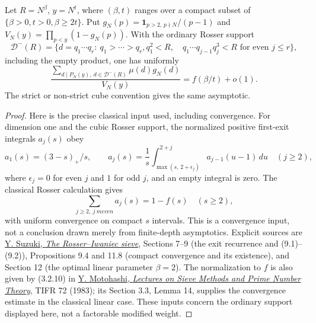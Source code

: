 \begin{lemma}
\label{lem:uniform-residual-lower-density}
Let $R=N^\beta$, $y=N^t$, where $(\beta,t)$ ranges over a compact
subset of $\{\beta>0,t>0,\beta\ge2t\}$. Put
$g_N(p)=\mathbf1_{p>2,\,p\nmid N}/(p-1)$ and
$V_N(y)=\prod_{p<y}(1-g_N(p))$. With the ordinary Rosser support
\[
 \mathcal D^-(R)=\{d=q_1\cdots q_r:\ q_1>\cdots>q_r,
 q_1^2<R,\quad q_1\cdots q_{j-1}q_j^3<R
 \text{ for even }j\le r\},
\]
including the empty product, one has uniformly
\[
 \frac{\sum_{d\mid P_N(y),\ d\in\mathcal D^-(R)}\mu(d)g_N(d)}
 {V_N(y)}=f(\beta/t)+o(1).
\]
The strict or non-strict cube convention gives the same asymptotic.
\end{lemma}
\begin{proof}
Here is the precise classical input used, including convergence. For
dimension one and the cubic Rosser support, the normalized positive
first-exit integrals $a_j(s)$ obey
\[
 a_1(s)=(3-s)_+/s,\qquad
 a_j(s)=\frac1s\int_{\max(s,\,2+\epsilon_j)}^{2+j}
                  a_{j-1}(u-1)\,du\quad(j\ge2),
\]
where $\epsilon_j=0$ for even $j$ and $1$ for odd $j$, and an
empty integral is zero. The classical Rosser calculation gives
\begin{equation}\label{eq:classical-positive-exit-series}
 \sum_{j\ge2,\ j\ {
m even}}a_j(s)=1-f(s)\quad(s\ge2),
\end{equation}
with uniform convergence on compact $s$ intervals. This is a
convergence input, not a conclusion drawn merely from finite-depth
asymptotics. Explicit sources are
\href{https://www.suzuyu1729.com/notes/NagoyaSeminar2022/RosserIwaniec.pdf}
{Y. Suzuki, \emph{The Rosser--Iwaniec sieve}}, Sections 7--9
(the exit recurrence and (9.1)--(9.2)), Propositions 9.4 and 11.8
(compact convergence and its existence), and Section 12
(the optimal linear parameter $\beta=2$).
The normalization to $f$ is also given by (3.2.10) in
\href{https://mathweb.tifr.res.in/Documents/Publications/Lectures/tifr72.pdf}
{Y. Motohashi, \emph{Lectures on Sieve Methods and Prime Number Theory}},
TIFR 72 (1983); its Section 3.3, Lemma 14, supplies the convergence
estimate in the classical linear case. These inputs concern the
ordinary support displayed here, not a factorable modified weight.


\end{proof}
